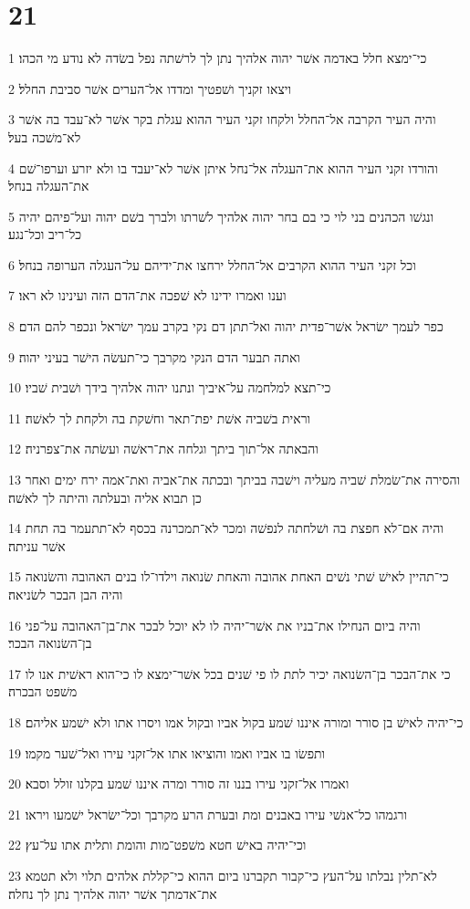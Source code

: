 \chapter{21}

\par 1 כי־ימצא חלל באדמה אשׁר יהוה אלהיך נתן לך לרשׁתה נפל בשׂדה לא נודע מי הכהו׃
\par 2 ויצאו זקניך ושׁפטיך ומדדו אל־הערים אשׁר סביבת החלל׃
\par 3 והיה העיר הקרבה אל־החלל ולקחו זקני העיר ההוא עגלת בקר אשׁר לא־עבד בה אשׁר לא־משׁכה בעל׃
\par 4 והורדו זקני העיר ההוא את־העגלה אל־נחל איתן אשׁר לא־יעבד בו ולא יזרע וערפו־שׁם את־העגלה בנחל׃
\par 5 ונגשׁו הכהנים בני לוי כי בם בחר יהוה אלהיך לשׁרתו ולברך בשׁם יהוה ועל־פיהם יהיה כל־ריב וכל־נגע׃
\par 6 וכל זקני העיר ההוא הקרבים אל־החלל ירחצו את־ידיהם על־העגלה הערופה בנחל׃
\par 7 וענו ואמרו ידינו לא שׁפכה את־הדם הזה ועינינו לא ראו׃
\par 8 כפר לעמך ישׂראל אשׁר־פדית יהוה ואל־תתן דם נקי בקרב עמך ישׂראל ונכפר להם הדם׃
\par 9 ואתה תבער הדם הנקי מקרבך כי־תעשׂה הישׁר בעיני יהוה׃
\par 10 כי־תצא למלחמה על־איביך ונתנו יהוה אלהיך בידך ושׁבית שׁביו׃
\par 11 וראית בשׁביה אשׁת יפת־תאר וחשׁקת בה ולקחת לך לאשׁה׃
\par 12 והבאתה אל־תוך ביתך וגלחה את־ראשׁה ועשׂתה את־צפרניה׃
\par 13 והסירה את־שׂמלת שׁביה מעליה וישׁבה בביתך ובכתה את־אביה ואת־אמה ירח ימים ואחר כן תבוא אליה ובעלתה והיתה לך לאשׁה׃
\par 14 והיה אם־לא חפצת בה ושׁלחתה לנפשׁה ומכר לא־תמכרנה בכסף לא־תתעמר בה תחת אשׁר עניתה׃
\par 15 כי־תהיין לאישׁ שׁתי נשׁים האחת אהובה והאחת שׂנואה וילדו־לו בנים האהובה והשׂנואה והיה הבן הבכר לשׂניאה׃
\par 16 והיה ביום הנחילו את־בניו את אשׁר־יהיה לו לא יוכל לבכר את־בן־האהובה על־פני בן־השׂנואה הבכר׃
\par 17 כי את־הבכר בן־השׂנואה יכיר לתת לו פי שׁנים בכל אשׁר־ימצא לו כי־הוא ראשׁית אנו לו משׁפט הבכרה׃
\par 18 כי־יהיה לאישׁ בן סורר ומורה איננו שׁמע בקול אביו ובקול אמו ויסרו אתו ולא ישׁמע אליהם׃
\par 19 ותפשׂו בו אביו ואמו והוציאו אתו אל־זקני עירו ואל־שׁער מקמו׃
\par 20 ואמרו אל־זקני עירו בננו זה סורר ומרה איננו שׁמע בקלנו זולל וסבא׃
\par 21 ורגמהו כל־אנשׁי עירו באבנים ומת ובערת הרע מקרבך וכל־ישׂראל ישׁמעו ויראו׃
\par 22 וכי־יהיה באישׁ חטא משׁפט־מות והומת ותלית אתו על־עץ׃
\par 23 לא־תלין נבלתו על־העץ כי־קבור תקברנו ביום ההוא כי־קללת אלהים תלוי ולא תטמא את־אדמתך אשׁר יהוה אלהיך נתן לך נחלה׃

